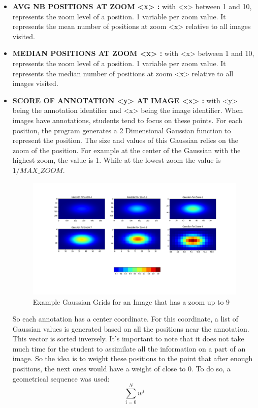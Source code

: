 \documentclass[a4paper,11pt]{report}
\numberwithin{figure}{section} %
\begin{document}
\begin{itemize}
    \item[\textbullet] \textbf{AVG NB POSITIONS AT ZOOM <x> :} with <x> between 1 and 10, represents the zoom level of a position.
    1 variable per zoom value.
    It represents the mean number of positions at zoom <x> relative to all images visited.\\
    \item[\textbullet] \textbf{MEDIAN POSITIONS AT ZOOM <x> :} with <x> between 1 and 10, represents the zoom level of a position.
    1 variable per zoom value.
    It represents the median number of positions at zoom <x> relative to all images visited.\\
    \item[\textbullet] \label{enum:score} \textbf{SCORE OF ANNOTATION <y> AT IMAGE <x> :} with <y> being the annotation identifier and <x> being the image identifier.
    When images have annotations, students tend to focus on these points.
    For each position, the program generates a 2 Dimensional Gaussian function to represent the position.
    The size and values of this Gaussian relies on the zoom of the position.
    For example at the center of the Gaussian with the highest zoom, the value is 1.
    While at the lowest zoom the value is $1/MAX\_ZOOM$.
    \begin{figure}[H]
\begin{center}
\includegraphics[scale=0.35]{plots/gaussian.png}
\caption{Example Gaussian Grids for an Image that has a zoom up to 9}
\end{center}
\end{figure} 
   
   So each annotation has a center coordinate.
   For this coordinate, a list of Gaussian values is generated based on all the positions near the annotation.
   This vector is sorted inversely.
   It's important to note that it does not take much time for the student to assimilate all the information on a part of an image.
   So the idea is to weight these positions to the point that after enough positions, the next ones would have a weight of close to 0.
To do so, a geometrical sequence was used:  
	\[\sum\limits_{i=0}^N w^i\]


\end{itemize}
\end{document}
